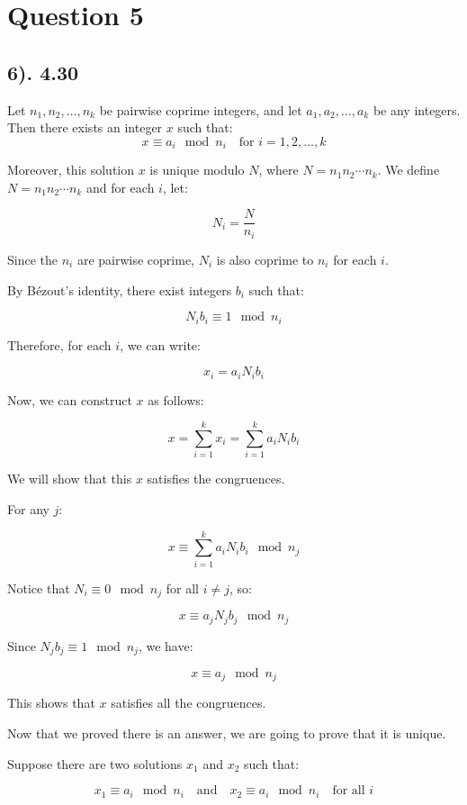 \documentclass[12pt]{article}
\begin{document}
\section*{Question 5}
\subsection*{6). 4.30}
Let \( n_1, n_2, \ldots, n_k \) be pairwise coprime integers, and let \( a_1, a_2, \ldots, a_k \) be any integers. Then there exists an integer \( x \) such that:
\[
x \equiv a_i \mod n_i \quad \text{for } i = 1, 2, \ldots, k
\]

Moreover, this solution \( x \) is unique modulo \( N \), where \( N = n_1 n_2 \cdots n_k \).
We define \( N = n_1 n_2 \cdots n_k \) and for each \( i \), let:

\[
N_i = \frac{N}{n_i}
\]

Since the \( n_i \) are pairwise coprime, \( N_i \) is also coprime to \( n_i \) for each \( i \).

By Bézout's identity, there exist integers \( b_i \) such that:

\[
N_i b_i \equiv 1 \mod n_i
\]

Therefore, for each \( i \), we can write:

\[
x_i = a_i N_i b_i
\]

Now, we can construct \( x \) as follows:

\[
x = \sum_{i=1}^k x_i = \sum_{i=1}^k a_i N_i b_i
\]

We will show that this \( x \) satisfies the congruences.

For any \( j \):

\[
x \equiv \sum_{i=1}^k a_i N_i b_i \mod n_j
\]

Notice that \( N_i \equiv 0 \mod n_j \) for all \( i \neq j \), so:

\[
x \equiv a_j N_j b_j \mod n_j
\]

Since \( N_j b_j \equiv 1 \mod n_j \), we have:

\[
x \equiv a_j \mod n_j
\]

This shows that \( x \) satisfies all the congruences.

Now that we proved there is an answer, we are going to prove that it is unique.

Suppose there are two solutions \( x_1 \) and \( x_2 \) such that:

\[
x_1 \equiv a_i \mod n_i \quad \text{and} \quad x_2 \equiv a_i \mod n_i \quad \text{for all } i
\]
\end{document}
